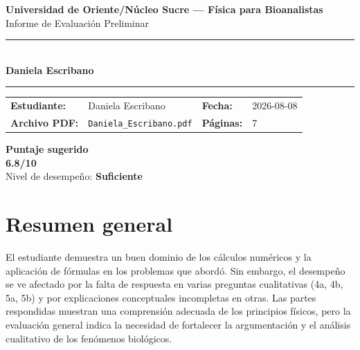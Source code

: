 \documentclass[11pt,a4paper]{article}
\begin{document}
\begin{center}
  {\Large\bfseries\color{azulTitulo} Universidad de Oriente/Núcleo Sucre --- Física para Bioanalistas}\\[4pt]
  {\large Informe de Evaluación Preliminar}\\[12pt]
  \rule{\linewidth}{1.2pt}\\[6pt]
  {\LARGE\bfseries Daniela Escribano}\\[4pt]
  \rule{\linewidth}{0.6pt}
\end{center}

\vspace{4pt}
\begin{tcolorbox}[cajaTitulo, title=Datos del informe]
\begin{tabular}{@{}llll@{}}
  \textbf{Estudiante:}  & Daniela Escribano  &
  \textbf{Fecha:}       & 2026-08-08 \\[4pt]
  \textbf{Archivo PDF:} & \texttt{Daniela\_Escribano.pdf}  &
  \textbf{Páginas:}     & 7 \\
\end{tabular}
\end{tcolorbox}

\vspace{6pt}
\begin{center}
  \begin{tcolorbox}[
    enhanced,
    colback=white, colframe=desempeno_suficiente,
    width=0.62\linewidth,
    boxrule=2pt,
    halign=center, valign=center,
    top=8pt, bottom=8pt,
  ]
    \centering
    {\large\bfseries Puntaje sugerido}\\[6pt]
    {\Huge\bfseries\color{desempeno_suficiente} 6.8/10}\\[6pt]
    {\large Nivel de desempeño: \textbf{\color{desempeno_suficiente} Suficiente}}
  \end{tcolorbox}
\end{center}

\section*{Resumen general}
El estudiante demuestra un buen dominio de los cálculos numéricos y la aplicación de fórmulas en los problemas que abordó. Sin embargo, el desempeño se ve afectado por la falta de respuesta en varias preguntas cualitativas (4a, 4b, 5a, 5b) y por explicaciones conceptuales incompletas en otras. Las partes respondidas muestran una comprensión adecuada de los principios físicos, pero la evaluación general indica la necesidad de fortalecer la argumentación y el análisis cualitativo de los fenómenos biológicos.
\end{document}
